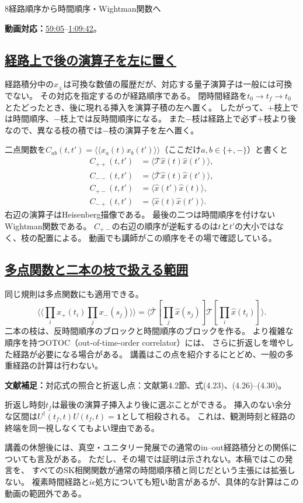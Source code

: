\documentclass[a4paper,11pt]{ltjsarticle}
\newcommand{\subsectionlink}[1]{\subsection[#1]{\hyperlink{toc}{#1}}}
\numberwithin{equation}{section}
\newcommand{\id}{\mathbf{1}}
\newcommand{\av}[1]{\langle #1\rangle}
\newcommand{\pav}[1]{\langle\!\langle #1\rangle\!\rangle}
\newcommand{\video}[2]{\href{https://www.youtube.com/watch?v=RYxzcUhIHjk\&t=#1s}{#2}}
\newcommand{\videosource}[1]{\par\noindent\textcolor{noteblue}{\textbf{動画対応：}#1}\par\smallskip}
\newcommand{\supplement}[1]{\par\medskip\noindent\textcolor{notered}{\textbf{文献補足：}}#1\par\smallskip}
\begin{document}
\begin{lecturesection}{8}{経路順序から時間順序・Wightman関数へ}
\label{sec:ordering}
\videosource{\video{3545}{59:05}--\video{4182}{1:09:42}。}
\subsectionlink{経路上で後の演算子を左に置く}
経路積分中の$x_\pm$は可換な数値の履歴だが、対応する量子演算子は一般には可換でない。
その対応を指定するのが経路順序である。
閉時間経路を$t_0\to t_f\to t_0$とたどったとき、後に現れる挿入を演算子積の左へ置く。
したがって、$+$枝上では時間順序、$-$枝上では反時間順序になる。
また$-$枝は経路上で必ず$+$枝より後なので、異なる枝の積では$-$枝の演算子を左へ置く。

二点関数を$C_{ab}(t,t')=\pav{x_a(t)x_b(t')}$（ここだけ$a,b\in\{+,-\}$）と書くと
\begin{align}
 C_{++}(t,t')&=\av{\mathcal T\hat x(t)\hat x(t')},\\
 C_{--}(t,t')&=\av{\overline{\mathcal T}\hat x(t)\hat x(t')},\\
 C_{+-}(t,t')&=\av{\hat x(t')\hat x(t)},\label{eq:cpm}\\
 C_{-+}(t,t')&=\av{\hat x(t)\hat x(t')}.\label{eq:cmp}
\end{align}
右辺の演算子はHeisenberg描像である。
最後の二つは時間順序を付けないWightman関数である。
$C_{+-}$の右辺の順序が逆転するのは$t$と$t'$の大小ではなく、枝の配置による。
動画でも講師がこの順序をその場で確認している。

\subsectionlink{多点関数と二本の枝で扱える範囲}
同じ規則は多点関数にも適用できる。
\begin{equation}
 \pav{\prod_i x_+(t_i)\prod_j x_-(s_j)}
  =\av{\overline{\mathcal T}\left[\prod_j\hat x(s_j)\right]
          \mathcal T\left[\prod_i\hat x(t_i)\right]}.
\end{equation}
二本の枝は、反時間順序のブロックと時間順序のブロックを作る。
より複雑な順序を持つOTOC（out-of-time-order correlator）には、
さらに折返しを増やした経路が必要になる場合がある。
講義はこの点を紹介するにとどめ、一般の多重経路の計算は行わない。

\supplement{対応式の照合と折返し点：文献\cite{Pajer:2026fuo}第4.2節、式(4.23)、(4.26)--(4.30)。}
折返し時刻$t_f$は最後の演算子挿入より後に選ぶことができる。
挿入のない余分な区間は$U^\dagger(t_f,t)U(t_f,t)=\id$として相殺される。
これは、観測時刻と経路の終端を同一視しなくてもよい理由である。

講義の休憩後には、真空・ユニタリー発展での通常のin--out経路積分との関係についても言及がある。
ただし、その場では証明は示されない。本稿ではこの発言を、
すべてのSK相関関数が通常の時間順序積と同じだという主張には拡張しない。
複素時間経路と$i\epsilon$処方についても短い助言があるが、具体的な計算はこの動画の範囲外である。
\end{lecturesection}
\end{document}
